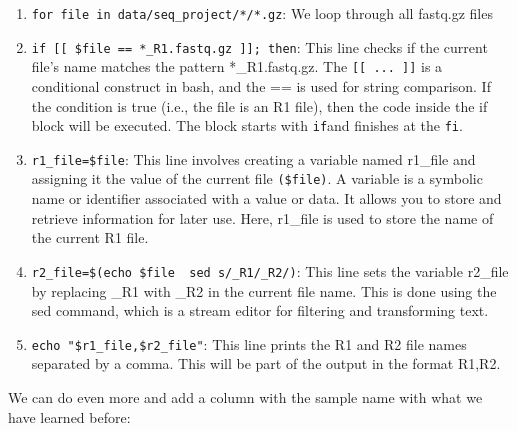\documentclass[
  letterpaper,
  DIV=11,
  numbers=noendperiod]{scrreprt}
\newenvironment{Shaded}{}{}
\newcommand{\AttributeTok}[1]{\textcolor[rgb]{0.84,0.23,0.29}{#1}}
\newcommand{\BuiltInTok}[1]{\textcolor[rgb]{0.84,0.23,0.29}{#1}}
\newcommand{\ControlFlowTok}[1]{\textcolor[rgb]{0.84,0.23,0.29}{#1}}
\newcommand{\FunctionTok}[1]{\textcolor[rgb]{0.44,0.26,0.76}{#1}}
\newcommand{\KeywordTok}[1]{\textcolor[rgb]{0.84,0.23,0.29}{#1}}
\newcommand{\NormalTok}[1]{\textcolor[rgb]{0.14,0.16,0.18}{#1}}
\newcommand{\OperatorTok}[1]{\textcolor[rgb]{0.14,0.16,0.18}{#1}}
\newcommand{\OtherTok}[1]{\textcolor[rgb]{0.44,0.26,0.76}{#1}}
\newcommand{\PreprocessorTok}[1]{\textcolor[rgb]{0.84,0.23,0.29}{#1}}
\newcommand{\StringTok}[1]{\textcolor[rgb]{0.01,0.18,0.38}{#1}}
\newcommand{\VariableTok}[1]{\textcolor[rgb]{0.89,0.38,0.04}{#1}}
\providecommand{\tightlist}{%
  \setlength{\itemsep}{0pt}\setlength{\parskip}{0pt}}\usepackage{longtable,booktabs,array}
\begin{document}
\begin{tcolorbox}
\begin{enumerate}
\def\labelenumi{\arabic{enumi}.}
\tightlist
\item
  \texttt{for\ file\ in\ data/seq\_project/*/*.gz}: We loop through all
  fastq.gz files
\item
  \texttt{if\ {[}{[}\ \$file\ ==\ *\_R1.fastq.gz\ {]}{]};\ then}: This
  line checks if the current file's name matches the pattern
  *\_R1.fastq.gz. The \texttt{{[}{[}\ ...\ {]}{]}} is a conditional
  construct in bash, and the == is used for string comparison. If the
  condition is true (i.e., the file is an R1 file), then the code inside
  the if block will be executed. The block starts with \texttt{if}and
  finishes at the \texttt{fi}.
\item
  \texttt{r1\_file=\$file}: This line involves creating a variable named
  r1\_file and assigning it the value of the current file
  \texttt{(\$file)}. A variable is a symbolic name or identifier
  associated with a value or data. It allows you to store and retrieve
  information for later use. Here, r1\_file is used to store the name of
  the current R1 file.
\item
  \texttt{r2\_file=\$(echo\ \$file\ \textbar{}\ sed\ \textquotesingle{}s/\_R1/\_R2/\textquotesingle{})}:
  This line sets the variable r2\_file by replacing \_R1 with \_R2 in
  the current file name. This is done using the sed command, which is a
  stream editor for filtering and transforming text.
\item
  \texttt{echo\ "\$r1\_file,\$r2\_file"}: This line prints the R1 and R2
  file names separated by a comma. This will be part of the output in
  the format R1,R2.
\end{enumerate}

We can do even more and add a column with the sample name with what we
have learned before:

\begin{Shaded}
\end{Shaded}


\end{tcolorbox}
\end{document}
